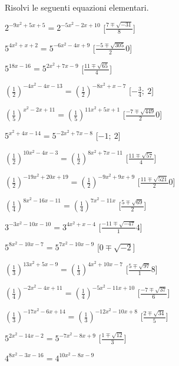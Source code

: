 \begin{esercizio}\label{ese:}
 Risolvi le seguenti equazioni elementari.
 \begin{enumeratea}
  \item  \(2^{-9 x^2 +5 x +5} = 2^{-5 x^2 -2 x +10}\)
   \hfill [\(\frac{7 \mp \sqrt{-31}} 8\)]
  \item  \(5^{4 x^2 + x +2} = 5^{-6 x^2 -4 x +9}\)
   \hfill [\(\frac{-5 \mp \sqrt{305}} 20\)]
  \item  \(5^{18 x -16} = 5^{2 x^2 +7 x -9}\)
   \hfill [\(\frac{11 \mp \sqrt{65}} 4\)]
  \item  \(\left(\frac{1}{2}\right)^{-4 x^2 -4 x -13} = 
\left(\frac{1}{2}\right)^{-8 x^2 + x -7}\)
   \hfill [\(-\frac{3}{4};~2\)]
  \item  \(\left(\frac{1}{5}\right)^{x^2 -2 x +11} = 
\left(\frac{1}{5}\right)^{11 x^2 +5 x +1}\)
   \hfill [\(\frac{-7 \mp \sqrt{449}} 20\)]
  \item  \(5^{x^2 +4 x -14} = 5^{-2 x^2 +7 x -8}\)
   \hfill [\(-1;~2\)]
  \item  \(\left(\frac{1}{2}\right)^{10 x^2 -4 x -3} = 
\left(\frac{1}{2}\right)^{8 x^2 +7 x -11}\)
   \hfill [\(\frac{11 \mp \sqrt{57}} 4\)]
  \item  \(\left(\frac{1}{2}\right)^{-19 x^2 +20 x +19} = 
\left(\frac{1}{2}\right)^{-9 x^2 +9 x +9}\)
   \hfill [\(\frac{11 \mp \sqrt{521}} 20\)]
  \item  \(\left(\frac{1}{4}\right)^{8 x^2 -16 x -11} = 
\left(\frac{1}{4}\right)^{7 x^2 -11 x }\)
   \hfill [\(\frac{5 \mp \sqrt{69}} 2\)]
  \item  \(3^{-3 x^2 -10 x -10} = 3^{4 x^2 + x -4}\)
   \hfill [\(\frac{-11 \mp \sqrt{-47}} 14\)]
  \item  \(5^{8 x^2 -10 x -7} = 5^{7 x^2 -10 x -9}\)
   \hfill [\(0 \mp \sqrt{-2}\)]
  \item  \(\left(\frac{1}{3}\right)^{13 x^2 +5 x -9} = 
\left(\frac{1}{3}\right)^{4 x^2 +10 x -7}\)
   \hfill [\(\frac{5 \mp \sqrt{97}} 18\)]
  \item  \(\left(\frac{1}{4}\right)^{-2 x^2 -4 x +11} = 
\left(\frac{1}{4}\right)^{-5 x^2 -11 x +10}\)
   \hfill [\(\frac{-7 \mp \sqrt{37}} 6\)]
  \item  \(\left(\frac{1}{3}\right)^{-17 x^2 -6 x +14} = 
\left(\frac{1}{3}\right)^{-12 x^2 -10 x +8}\)
   \hfill [\(\frac{2 \mp \sqrt{34}} 5\)]
  \item  \(5^{2 x^2 -14 x -2} = 5^{-7 x^2 -8 x +9}\)
   \hfill [\(\frac{1 \mp \sqrt{12}} 3\)]
  \item  \(4^{8 x^2 -3 x -16} = 4^{10 x^2 -8 x -9}\)

\end{enumeratea}
\end{esercizio}
